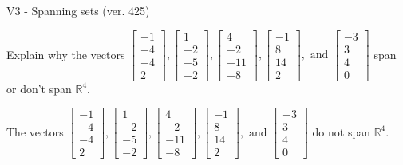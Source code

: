 \begin{exercise}
  \begin{exerciseTitle}V3 - Spanning sets (ver. 425)\end{exerciseTitle}
  \begin{exerciseStatement}
    Explain why the vectors \(\left[\begin{array}{r}
-1 \\
-4 \\
-4 \\
2
\end{array}\right] , \left[\begin{array}{r}
1 \\
-2 \\
-5 \\
-2
\end{array}\right] , \left[\begin{array}{r}
4 \\
-2 \\
-11 \\
-8
\end{array}\right] , \left[\begin{array}{r}
-1 \\
8 \\
14 \\
2
\end{array}\right] , \text{ and } \left[\begin{array}{r}
-3 \\
3 \\
4 \\
0
\end{array}\right]\) span or don't span \(\mathbb{R}^4\). 
	


  \end{exerciseStatement}
  \begin{exerciseAnswer}
   The vectors \(\left[\begin{array}{r}
-1 \\
-4 \\
-4 \\
2
\end{array}\right] , \left[\begin{array}{r}
1 \\
-2 \\
-5 \\
-2
\end{array}\right] , \left[\begin{array}{r}
4 \\
-2 \\
-11 \\
-8
\end{array}\right] , \left[\begin{array}{r}
-1 \\
8 \\
14 \\
2
\end{array}\right] , \text{ and } \left[\begin{array}{r}
-3 \\
3 \\
4 \\
0
\end{array}\right]\) 
  	 do not  
	span \(\mathbb{R}^4\).
  



\end{exerciseAnswer}
\end{exercise}
